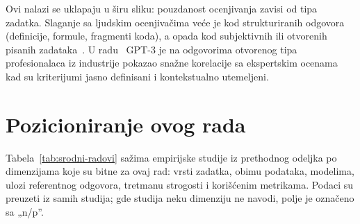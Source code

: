 Ovi nalazi se uklapaju u širu sliku: pouzdanost ocenjivanja zavisi od tipa zadatka.
Slaganje sa ljudskim ocenjivačima veće je kod strukturiranih odgovora (definicije, formule, fragmenti koda),
a opada kod subjektivnih ili otvorenih pisanih zadataka~\cite{tomic2022ai,vittorini2021ai}.
U radu~\cite{pinto2023large} GPT-3 je na odgovorima otvorenog tipa profesionalaca iz industrije
pokazao snažne korelacije sa ekspertskim ocenama kad su kriterijumi jasno definisani i kontekstualno utemeljeni.

\section{Pozicioniranje ovog rada}
\label{sec:pozicioniranje}

Tabela~\ref{tab:srodni-radovi} sažima empirijske studije iz prethodnog odeljka po dimenzijama koje su bitne za ovaj rad:
vrsti zadatka, obimu podataka, modelima, ulozi referentnog odgovora, tretmanu strogosti i korišćenim metrikama.
Podaci su preuzeti iz samih studija;
gde studija neku dimenziju ne navodi, polje je označeno sa „n/p''.

